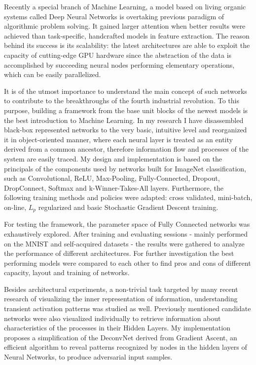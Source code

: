 
Recently a special branch of Machine Learning, a model based on living organic systems called Deep Neural Networks is overtaking previous paradigm of algorithmic problem solving. 
It gained larger attention when better results were achieved than task-specific, handcrafted models in feature extraction. 
The reason behind its success is its scalability: the latest architectures are able to exploit the capacity of cutting-edge GPU hardware since the abstraction of the data is accomplished by succeeding neural nodes performing elementary operations, which can be easily parallelized.

It is of the utmost importance to understand the main concept of such networks to contribute to the breakthroughs of the fourth industrial revolution. 
To this purpose, building a framework from the base unit blocks of the newest models is the best introduction to Machine Learning. 
In my research I have disassembled black-box represented networks to the very basic, intuitive level and reorganized it in object-oriented manner, where each neural layer is treated as an entity derived from a common ancestor, therefore information flow and processes of the system are easily traced. 
My design and implementation is based on the principals of the components used by networks built for ImageNet classification, such as Convolutional, ReLU, Max-Pooling, Fully-Connected, Dropout, DropConnect, Softmax and k-Winner-Takes-All layers.
Furthermore, the following training methods and policies were adapted: cross validated, mini-batch, on-line, $L_p$ regularized and basic Stochastic Gradient Descent training.

For testing the framework, the parameter space of Fully Connected networks was exhaustively explored. 
After training and evaluating sessions - mainly performed on the MNIST and self-acquired datasets - the results were gathered to analyze the performance of different architectures. 
For further investigation the best performing models  were compared to each other to find pros and cons of different capacity, layout and training of networks.

Besides architectural experiments, a non-trivial task targeted by many recent research of visualizing the inner representation of information, understanding transient activation patterns was studied as well.
Previously mentioned candidate networks were also visualized individually to retrieve information about characteristics of the processes in their Hidden Layers.
My implementation proposes a simplification of the DeconvNet derived from Gradient Ascent, an efficient algorithm to reveal patterns recognized by nodes in the hidden layers of Neural Networks, to produce adversarial input samples.
